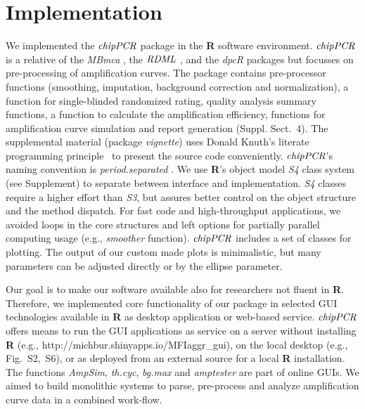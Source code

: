 \documentclass{bioinfo}
\begin{document}
\section{Implementation}
\begin{methods}

We implemented the $\emph{chipPCR}$ package in the \textbf{R} software 
environment. $\emph{chipPCR}$ is a relative of the \emph{MBmca} 
\citep{roediger_RJ_2013}, the $\emph{RDML}$ \citep{blagodatskikh_2014}, and the 
\emph{dpcR} \citep{pabinger_2014} packages but focusses on pre-processing of 
amplification curves. The package contains pre-processor functions (smoothing, 
imputation, background correction and normalization), a function for single-blinded 
randomized rating, quality analysis summary functions, a function to calculate 
the amplification efficiency, functions for amplification curve simulation and 
report 
generation (Suppl. Sect.~4). The supplemental material %
(package \textit{vignette}) uses Donald Knuth's literate programming 
principle~\citep{Knuth1984} to present the source code conveniently. 
$\emph{chipPCR}$'s naming convention is \textit{period.separated} 
\citep{Baaaath_2012}. We use \textbf{R}'s object model \emph{S4} class system 
(see Supplement) to separate between interface and implementation. \emph{S4} 
classes require a higher effort than \emph{S3}, but assures better control on 
the object structure and the method dispatch. For fast code and high-throughput 
applications, we avoided loops in the core structures and left options for 
partially parallel computing usage (e.g., \textsl{smoother} function). 
$\emph{chipPCR}$ includes a set of classes for plotting. The output of our 
custom made plots is minimalistic, but many parameters can be adjusted directly 
or by the ellipse parameter.

Our goal is to make our software available also for researchers not fluent in 
\textbf{R}. Therefore, we implemented core functionality of our package in 
selected GUI technologies available in \textbf{R} \citep{rodiger_rkward_2012} as 
desktop application or web-based service. $\emph{chipPCR}$ offers means to run 
the GUI applications as service on a server without installing \textbf{R} (e.g., 
http://michbur.shinyapps.io/MFIaggr\_gui), on the local 
desktop (e.g., Fig.~S2,~S6), or as deployed from an external %
source for a local \textbf{R} installation. The functions \textsl{AmpSim}, 
\textsl{th.cyc}, \textsl{bg.max} and \textsl{amptester} are part of online GUIs. 
We aimed to build monolithic systems to parse, pre-process and analyze 
amplification curve data in a combined work-flow. 


\end{methods}
\end{document}
